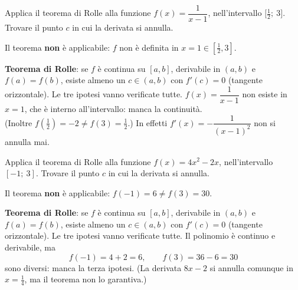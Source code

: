 \begin{question}[ID=1.7, subtitle={Teorema di Rolle non applicabile: $f(x)=1/(x-1)$ su $[1/2,3]$}, tags={rolle, teoremi, non applicabile}, difficulty=media]
Applica il teorema di Rolle alla funzione \(f(x) = \dfrac{1}{x-1}\), nell'intervallo \(\bigl[\tfrac{1}{2};\ 3\bigr]\). Trovare il punto \(c\) in cui la derivata si annulla.
\begin{solution}
Il teorema \textbf{non} è applicabile: $f$ non è definita in $x=1\in\left[\tfrac12,3\right]$.
\end{solution}
\begin{explanation}
\textbf{Teorema di Rolle}: se $f$ è continua su $[a,b]$, derivabile in $(a,b)$ e $f(a)=f(b)$, esiste almeno un $c\in(a,b)$ con $f'(c)=0$ (tangente orizzontale). Le tre ipotesi vanno verificate tutte.
$f(x)=\dfrac1{x-1}$ non esiste in $x=1$, che è interno all'intervallo: manca la continuità. \\
(Inoltre $f\left(\tfrac12\right)=-2\neq f(3)=\tfrac12$.) In effetti $f'(x)=-\dfrac{1}{(x-1)^2}$ non si annulla mai.
\end{explanation}
\end{question}


\begin{question}[ID=1.8, subtitle={Teorema di Rolle non applicabile: $f(x)=4x^2-2x$ su $[-1,3]$}, tags={rolle, teoremi, non applicabile}, difficulty=facile]
Applica il teorema di Rolle alla funzione \(f(x) = 4x^2 -2x\), nell'intervallo \([-1;\ 3]\). Trovare il punto \(c\) in cui la derivata si annulla.
\begin{solution}
Il teorema \textbf{non} è applicabile: $f(-1)=6\neq f(3)=30$.
\end{solution}
\begin{explanation}
\textbf{Teorema di Rolle}: se $f$ è continua su $[a,b]$, derivabile in $(a,b)$ e $f(a)=f(b)$, esiste almeno un $c\in(a,b)$ con $f'(c)=0$ (tangente orizzontale). Le tre ipotesi vanno verificate tutte.
Il polinomio è continuo e derivabile, ma
\[ f(-1)=4+2=6, \qquad f(3)=36-6=30 \]
sono diversi: manca la terza ipotesi. (La derivata $8x-2$ si annulla comunque in $x=\tfrac14$, ma il teorema non lo garantiva.)
\end{explanation}
\end{question}


